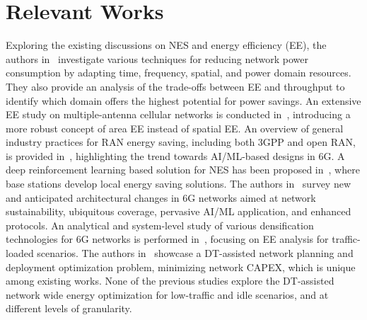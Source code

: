 \section{Relevant Works}
\label{sec:related}

Exploring the existing discussions on NES and energy efficiency (EE), the authors in~\cite{10121451} investigate various techniques for reducing network power consumption by adapting time, frequency, spatial, and power domain resources. They also provide an analysis of the trade-offs between EE and throughput to identify which domain offers the highest potential for power savings.
An extensive EE study on multiple-antenna cellular networks is conducted in~\cite{8454484}, introducing a more robust concept of area EE instead of spatial EE.
An overview of general industry practices for RAN energy saving, including both 3GPP and open RAN, is provided in~\cite{kundu2024energyefficientranindustry}, highlighting the trend towards AI/ML-based designs in 6G.
{A deep reinforcement learning based solution for NES has been proposed in~\cite{low_traffic_nes_samsung}, where base stations develop local energy saving solutions.}
The authors in~\cite{8922617} survey new and anticipated architectural changes in 6G networks aimed at network sustainability, ubiquitous coverage, pervasive AI/ML application, and enhanced protocols.
An analytical and system-level study of various densification technologies for 6G networks is performed in~\cite{azzino2024energycostefficient6gnetworks}, focusing on EE analysis for traffic-loaded scenarios.
The authors in~\cite{deployement_paper} showcase a DT-assisted network planning and deployment optimization problem, minimizing network CAPEX, which is unique among existing works. 
{None of the previous studies explore the DT-assisted network wide energy optimization for low-traffic and idle scenarios, and at different levels of granularity.}

